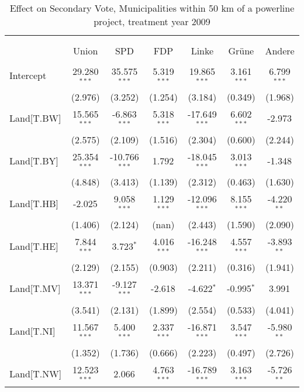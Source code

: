 \begin{table}[!htbp] \centering
  \caption{Effect on Secondary Vote, Municipalities within 50 km of a powerline project, treatment year 2009}
\begin{tabular}{@{\extracolsep{5pt}}lcccccc}
\\[-1.8ex]\hline
\hline \\[-1.8ex]
\\[-1.8ex] & \multicolumn{1}{c}{Union} & \multicolumn{1}{c}{SPD} & \multicolumn{1}{c}{FDP} & \multicolumn{1}{c}{Linke} & \multicolumn{1}{c}{Grüne} & \multicolumn{1}{c}{Andere}  \\
\hline \\[-1.8ex]
 Intercept & 29.280$^{***}$ & 35.575$^{***}$ & 5.319$^{***}$ & 19.865$^{***}$ & 3.161$^{***}$ & 6.799$^{***}$ \\
  & (2.976) & (3.252) & (1.254) & (3.184) & (0.349) & (1.968) \\
 Land[T.BW] & 15.565$^{***}$ & -6.863$^{***}$ & 5.318$^{***}$ & -17.649$^{***}$ & 6.602$^{***}$ & -2.973$^{}$ \\
  & (2.575) & (2.109) & (1.516) & (2.304) & (0.600) & (2.244) \\
 Land[T.BY] & 25.354$^{***}$ & -10.766$^{***}$ & 1.792$^{}$ & -18.045$^{***}$ & 3.013$^{***}$ & -1.348$^{}$ \\
  & (4.848) & (3.413) & (1.139) & (2.312) & (0.463) & (1.630) \\
 Land[T.HB] & -2.025$^{}$ & 9.058$^{***}$ & 1.129$^{***}$ & -12.096$^{***}$ & 8.155$^{***}$ & -4.220$^{**}$ \\
  & (1.406) & (2.124) & (nan) & (2.443) & (1.590) & (2.090) \\
 Land[T.HE] & 7.844$^{***}$ & 3.723$^{*}$ & 4.016$^{***}$ & -16.248$^{***}$ & 4.557$^{***}$ & -3.893$^{**}$ \\
  & (2.129) & (2.155) & (0.903) & (2.211) & (0.316) & (1.941) \\
 Land[T.MV] & 13.371$^{***}$ & -9.127$^{***}$ & -2.618$^{}$ & -4.622$^{*}$ & -0.995$^{*}$ & 3.991$^{}$ \\
  & (3.541) & (2.131) & (1.899) & (2.554) & (0.533) & (4.041) \\
 Land[T.NI] & 11.567$^{***}$ & 5.400$^{***}$ & 2.337$^{***}$ & -16.871$^{***}$ & 3.547$^{***}$ & -5.980$^{**}$ \\
  & (1.352) & (1.736) & (0.666) & (2.223) & (0.497) & (2.726) \\
 Land[T.NW] & 12.523$^{***}$ & 2.066$^{}$ & 4.763$^{***}$ & -16.789$^{***}$ & 3.163$^{***}$ & -5.726$^{**}$ \\

\end{tabular}
\end{table}
